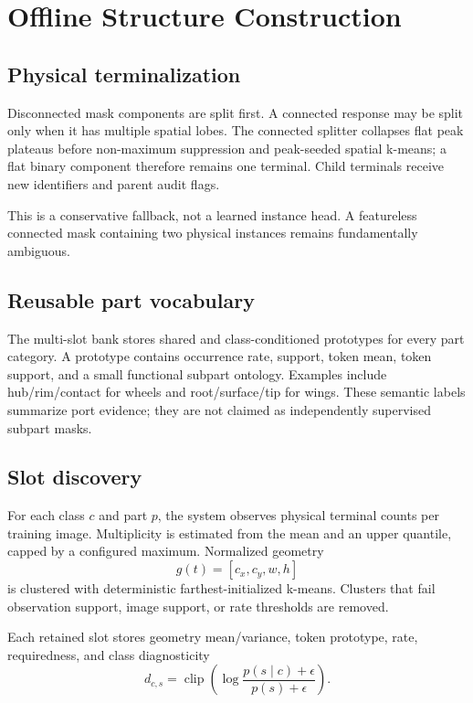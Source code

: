 \documentclass[11pt]{article}
\begin{document}
\section{Offline Structure Construction}

\subsection{Physical terminalization}

Disconnected mask components are split first. A connected response may be split
only when it has multiple spatial lobes. The connected splitter collapses flat
peak plateaus before non-maximum suppression and peak-seeded spatial k-means; a
flat binary component therefore remains one terminal. Child terminals receive new
identifiers and parent audit flags.

This is a conservative fallback, not a learned instance head. A featureless
connected mask containing two physical instances remains fundamentally ambiguous.

\subsection{Reusable part vocabulary}

The multi-slot bank stores shared and class-conditioned prototypes for every part
category. A prototype contains occurrence rate, support, token mean, token
support, and a small functional subpart ontology. Examples include hub/rim/contact
for wheels and root/surface/tip for wings. These semantic labels summarize port
evidence; they are not claimed as independently supervised subpart masks.

\subsection{Slot discovery}

For each class $c$ and part $p$, the system observes physical terminal counts per
training image. Multiplicity is estimated from the mean and an upper quantile,
capped by a configured maximum. Normalized geometry
\[
g(t)=[c_x,c_y,w,h]
\]
is clustered with deterministic farthest-initialized k-means. Clusters that fail
observation support, image support, or rate thresholds are removed.

Each retained slot stores geometry mean/variance, token prototype, rate,
requiredness, and class diagnosticity
\[
d_{c,s}=\operatorname{clip}\left(
\log\frac{p(s\mid c)+\epsilon}{p(s)+\epsilon}
\right).
\]
\end{document}
